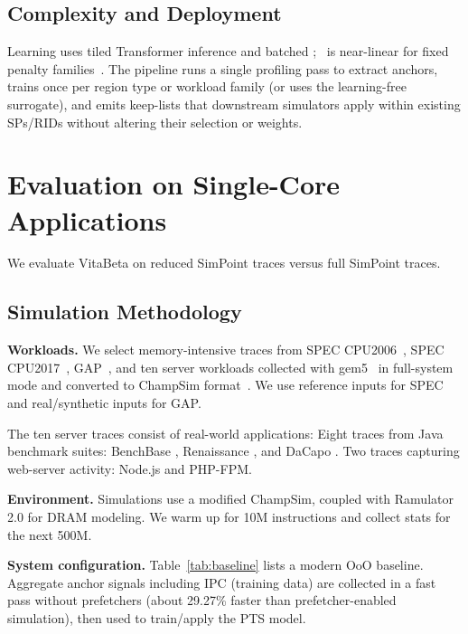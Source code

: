 \subsection{Complexity and Deployment}
Learning uses tiled Transformer inference and batched \gam; \pelt\ is near-linear for fixed penalty families~\cite{pelt12,ruptures20}. The pipeline runs a single profiling pass to extract anchors, trains once per region type or workload family (or uses the learning-free surrogate), and emits keep-lists that downstream simulators apply within existing SPs/RIDs without altering their selection or weights.

  
 

\section{Evaluation on Single-Core Applications} 
\label{evaluation_sc}
We evaluate VitaBeta on reduced SimPoint traces versus full SimPoint traces.

\subsection{Simulation Methodology}
\label{subsec:expsetup}
\textbf{Workloads.} We select memory-intensive traces from SPEC CPU2006~\cite{spec2006}, SPEC CPU2017~\cite{spec2017}, GAP~\cite{beamer2017gapbenchmarksuite}, and ten server workloads collected with gem5~\cite{gem52011} in full-system mode and converted to ChampSim format~\cite{llbp_workloads}. We use reference inputs for SPEC and real/synthetic inputs for GAP.

The ten server traces consist of real-world applications: Eight traces from Java benchmark suites: BenchBase \cite{oltp_bench}, Renaissance \cite{java_renaissance}, and DaCapo \cite{java_dacapo}. Two traces capturing web-server activity: Node.js and PHP-FPM.

\textbf{Environment.} Simulations use a modified ChampSim\cite{ChampSim}, coupled with Ramulator 2.0\cite{luo2023ramulator20modernmodular} for DRAM modeling. We warm up for 10M instructions and collect stats for the next 500M.

\textbf{System configuration.} Table~\ref{tab:baseline} lists a modern OoO baseline. Aggregate anchor signals including IPC (training data) are collected in a fast pass without prefetchers (about 29.27\% faster than prefetcher-enabled simulation), then used to train/apply the PTS model.

